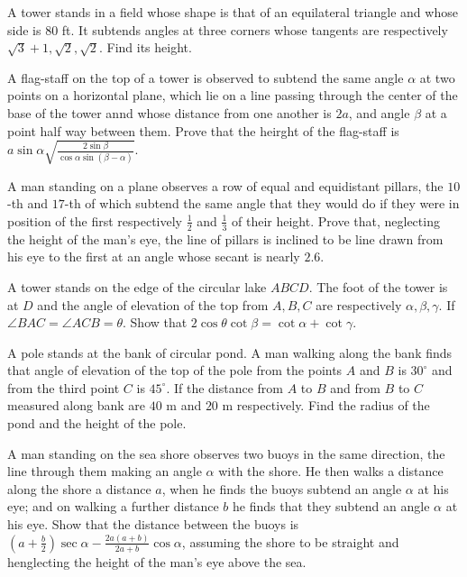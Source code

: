 \item A tower stands in a field whose shape is that of an equilateral triangle and whose side is $80$ ft. It subtends angles
  at three corners whose tangents are respectively $\sqrt{3} + 1, \sqrt{2}, \sqrt{2}$. Find its height.

\item A flag-staff on the top of a tower is observed to subtend the same angle $\alpha$ at two points on a horizontal plane,
  which lie on a line passing through the center of the base of the tower annd whose distance from one another is $2a$,
  and angle $\beta$ at a point half way between them. Prove that the heirght of the flag-staff is
  $a\sin\alpha\sqrt{\frac{2\sin\beta}{\cos\alpha\sin(\beta - \alpha)}}$.

\item A man standing on a plane observes a row of equal and equidistant pillars, the $10$-th and $17$-th of which
  subtend the same angle that they would do if they were in position of the first respectively $\frac{1}{2}$ and
  $\frac{1}{3}$ of their height. Prove that, neglecting the height of the man's eye, the line of pillars is inclined to be
  line drawn from his eye to the first at an angle whose secant is nearly $2.6$.

\item A tower stands on the edge of the circular lake $ABCD$. The foot of the tower is at $D$ and the angle of elevation
  of the top from $A, B, C$ are respectively $\alpha, \beta, \gamma$. If $\angle BAC = \angle ACB =
  \theta$. Show that $2\cos\theta\cot\beta = \cot\alpha + \cot\gamma$.

\item A pole stands at the bank of circular pond. A man walking along the bank finds that angle of elevation of the top of the pole
  from the points $A$ and $B$ is $30^\circ$ and from the third point $C$ is $45^\circ$. If the
  distance from $A$ to $B$ and from $B$ to $C$ measured along bank are $40$ m and $20$ m
  respectively. Find the radius of the pond and the height of the pole.

\item A man standing on the sea shore observes two buoys in the same direction, the line through them making an angle $\alpha$
  with the shore. He then walks a distance along the shore a distance $a$, when he finds the buoys subtend an angle
  $\alpha$ at his eye; and on walking a further distance $b$ he finds that they subtend an angle $\alpha$ at
  his eye. Show that the distance between the buoys is $\left(a + \frac{b}{2}\right)\sec\alpha - \frac{2a(a + b)}{2a +
    b}\cos\alpha$, assuming the shore to be straight and henglecting the height of the man's eye above the sea.

